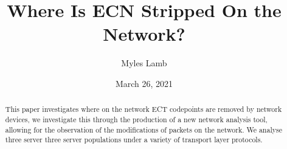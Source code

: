 \documentclass{l4proj}
\begin{document}
\title{Where Is ECN Stripped On the Network?}
\author{Myles Lamb}
\date{March 26, 2021}

\maketitle

\begin{abstract}
    
    This paper investigates where on the network ECT codepoints are removed by network devices, we investigate this through the production of a new network analysis tool, allowing for the observation of the modifications of packets on the network. We analyse three server three server populations under a variety of transport layer protocols.
\end{abstract}


%
%
\def\consentname {Myles Lamb} %
\def\consentdate {26 March 2021} %

\educationalconsent


\tableofcontents
\end{document}
